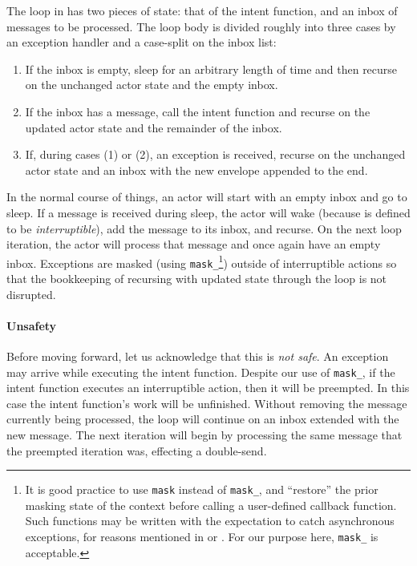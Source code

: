 \documentclass[sigplan,screen]{acmart}
\begin{document}
The loop in  has two pieces of state: that of the intent
function, and an inbox of messages to be processed.
%
The loop body is divided roughly into three cases by an exception
handler and a case-split on the inbox list:
%
\begin{enumerate}[leftmargin=2em]
    \item If the inbox is empty, sleep for an arbitrary length of time and then
    recurse on the unchanged actor state and the empty inbox.
    
    \item If the inbox has a message, call the intent function and recurse on
    the updated actor state and the remainder of the inbox.

    \item If, during cases (1) or (2), an  exception is received,
    recurse on the unchanged actor state and an inbox with the new envelope
    appended to the end.
\end{enumerate}
%
In the normal course of things, an actor will start with an empty inbox and go
to sleep.
%
If a message is received during sleep, the actor will wake (because
 is defined to be \emph{interruptible}), add the message to
its inbox, and recurse.
%
On the next loop iteration, the actor will process that message and once again
have an empty inbox.
%
Exceptions are masked (using \texttt{mask\_}\footnote{
    It is good practice to use \texttt{mask} instead of \texttt{mask\_}, and
    ``restore'' the prior masking state of the context before calling a
    user-defined callback function.
    Such functions may be written with the expectation to catch asynchronous
    exceptions, for reasons mentioned in  or
    \citet{marlow2001async}.
    For our purpose here, \texttt{mask\_} is acceptable.
}) outside of interruptible actions so that the bookkeeping
of recursing with updated state through the loop is not disrupted.


\paragraph{Unsafety}


Before moving forward, let us acknowledge that this is \emph{not safe}.
%
An exception may arrive while executing the intent function.
%
Despite our use of \texttt{mask\_},
if the intent function executes an interruptible action, then
it will be preempted.
%
In this case the intent function's work will be unfinished.
%
Without removing the message currently being processed, the loop
will continue on an inbox extended with the new message.
%
The next iteration will begin by processing the same message that the preempted
iteration was, effecting a double-send.
\end{document}
